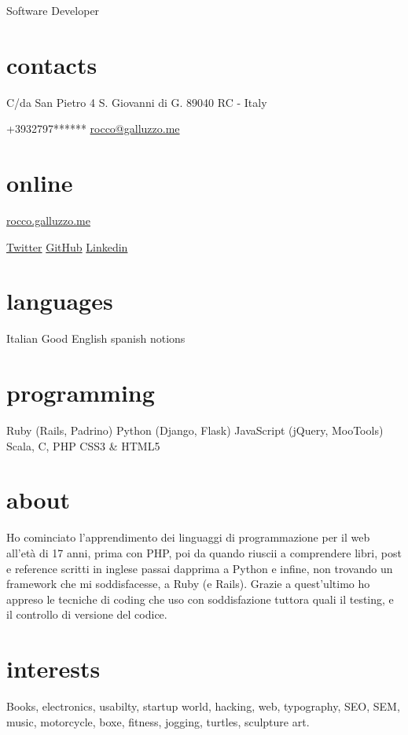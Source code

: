 \documentclass[print]{cv}
\begin{document}
       {Software Developer}

\begin{aside}%
\section{contacts}
    C/da San Pietro 4
    S. Giovanni di G.
89040 RC - Italy\par\smallskip%
+3932797******
	\href{mailto:rocco@galluzzo.me}{rocco@galluzzo.me}
	\section{online}
	\href{http://rocco.galluzzo.me}{rocco.galluzzo.me}
         \par\smallskip%
	\href{http://twitter.com/byterussian}{Twitter}
           \href{https://github.com/byterussian}{GitHub}
           \href{http://www.linkedin.com/in/roccogalluzzo}{Linkedin}
  \section{languages}
    Italian
    Good English
    spanish notions
  \section{programming}
    Ruby
    (Rails, Padrino)
    Python
    (Django, Flask)
    JavaScript
    (jQuery, MooTools)
    Scala, C, PHP
    CSS3 \& HTML5
\end{aside}

\section{about}
Ho cominciato l'apprendimento dei linguaggi di programmazione per il web all'età di 17 anni, 
prima con PHP, poi da quando riuscii a comprendere libri, post e reference scritti in inglese
 passai dapprima a Python e infine, non trovando un framework che mi soddisfacesse, a Ruby (e Rails). 
 Grazie a quest'ultimo ho appreso le tecniche di coding che uso con soddisfazione tuttora
 quali il testing, e il controllo di versione del codice.

\section{interests}

Books, electronics, usabilty, startup world, hacking, web, typography, SEO, SEM, music, motorcycle, boxe, fitness, jogging,
turtles, sculpture art.
\end{document}
